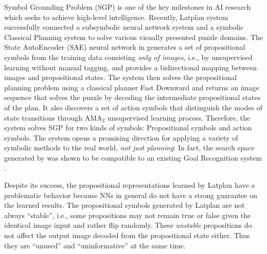 Symbol Grounding Problem (SGP) \cite{harnad1990symbol,Steels2008} is one of the key milestones in AI research
which seeks to achieve high-level intelligence.
% 
% 
Recently, Latplan system \cite[]{Asai2018} successfully
connected a subsymbolic neural network system and a symbolic Classical Planning system
to solve various visually presented puzzle domains.
The State AutoEncoder (SAE) neural network in \latentplanner
generates a set of propositional symbols from the training data consisting \emph{only of images},
i.e., by unsupervised learning without manual tagging,
and provides a bidirectional mapping between images and propositional states.
% 
The system then solves the propositional planning problem using a classical planner Fast Downward \cite{Helmert04}
and returns an image sequence that solves the puzzle
by decoding the intermediate propositional states of the plan.
It also discovers a set of action symbols that distinguish the modes of
state transitions through AMA$_2$ unsupervised learning process.
Therefore, the system solves SGP for two kinds of symbols:
Propositional symbols and action symbols.
% 
The system opens a promising direction for
applying a variety of symbolic methods to the real world, \emph{not just planning}:
In fact, the search space generated by \latentplanner was shown to be compatible
to an existing Goal Recognition system \cite{amado2018goal}.

Despite its success,
the propositional representations learned by Latplan have a problematic behavior
because NNs in general do not have a strong guarantee on the learned results.
The propositional symbols generated by Latplan are not always
``stable'', i.e., some propositions may not remain true or false given the identical image input
and rather flip randomly.
These \emph{unstable} propositions do not affect the output image decoded from the propositional state either.
Thus they are ``unused'' and ``uninformative'' at the same time.

